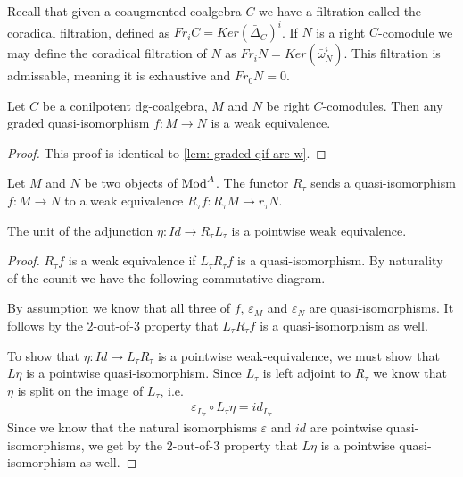 \documentclass[../thesis.tex]{subfiles}
\begin{document}
            Recall that given a coaugmented coalgebra $C$ we have a filtration called the coradical filtration, defined as $Fr_iC = Ker(\bar{\Delta}_C)^i$. If $N$ is a right $C$-comodule we may define the coradical filtration of $N$ as $Fr_iN = Ker(\bar{\omega}_N^i)$. This filtration is admissable, meaning it is exhaustive and $Fr_0N=0$.

            \begin{lemma}
                Let $C$ be a conilpotent dg-coalgebra, $M$ and $N$ be right $C$-comodules. Then any graded quasi-isomorphism $f: M \rightarrow N$ is a weak equivalence.
            \end{lemma}

            \begin{proof}
                This proof is identical to \ref{lem: graded-qif-are-w}.   
            \end{proof}

            \begin{lemma}
                Let $M$ and $N$ be two objects of $\tt{Mod}^A$. The functor $R_\tau$ sends a quasi-isomorphism $f: M \rightarrow N$ to a weak equivalence $R_\tau f: R_\tau M \rightarrow r_\tau N$.

                The unit of the adjunction $\eta : Id \rightarrow R_\tau L_\tau$ is a pointwise weak equivalence.
            \end{lemma}

            \begin{proof}
                $R_\tau f$ is a weak equivalence if $L_\tau R_\tau f$ is a quasi-isomorphism. By naturality of the counit we have the following commutative diagram.
                \begin{center}
                \end{center}

                By assumption we know that all three of $f$, $\varepsilon_M$ and $\varepsilon_N$ are quasi-isomorphisms. It follows by the $2$-out-of-$3$ property that $L_\tau R_\tau f$ is a quasi-isomorphism as well.

                To show that $\eta : Id \rightarrow L_\tau R_\tau$ is a pointwise weak-equivalence, we must show that $L\eta$ is a pointwise quasi-isomorphism. Since $L_\tau$ is left adjoint to $R_\tau$ we know that $\eta$ is split on the image of $L_\tau$, i.e.
                \begin{align*}
                    \varepsilon_{L_\tau}\circ L_\tau\eta = id_{L_\tau}
                \end{align*}
                Since we know that the natural isomorphisms $\varepsilon$ and $id$ are pointwise quasi-isomorphisms, we get by the $2$-out-of-$3$ property that $L\eta$ is a pointwise quasi-isomorphism as well.
            \end{proof}
\end{document}
